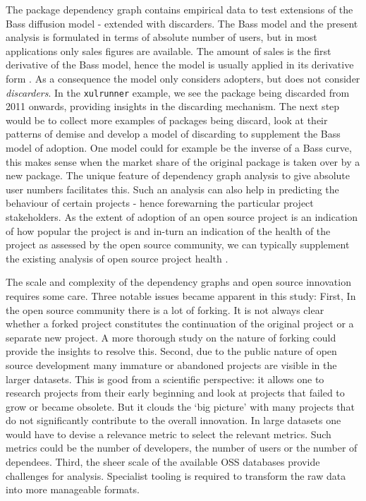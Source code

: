 \documentclass[smallextended,final]{svjour3}
\begin{document}
The package dependency graph contains empirical data to test extensions of the Bass diffusion model - extended with discarders. The Bass model and the present analysis is formulated in terms of absolute number of users, but in most applications only sales figures are available. The amount of sales is the first derivative of the Bass model, hence the model is usually applied in its derivative form \citep{mahajan95}. As a consequence the model only considers adopters, but does not consider \emph{discarders}. In the \verb|xulrunner| example, we see the package being discarded from 2011 onwards, providing insights in the discarding mechanism. The next step would be to collect more examples of packages being discard, look at their patterns of demise and develop a model of discarding to supplement the Bass model of adoption. One model could for example be the inverse of a Bass curve, this makes sense when the market share of the original package is taken over by a new package. The unique feature of dependency graph analysis to give absolute user numbers facilitates this. Such an analysis can also help in predicting the behaviour of certain projects - hence forewarning the particular project stakeholders. As the extent of adoption of an open source project is an indication of how popular the project is and in-turn an indication of the health of the project as assessed by the open source community, we can typically supplement the existing analysis of open source project health \citep{daniel13,amrit10a,piggot13}.

The scale and complexity of the dependency graphs and open source innovation requires some care. Three notable issues became apparent in this study: First, In the open source community there is a lot of forking. It is not always clear whether a forked project constitutes the continuation of the original project or a separate new project. A more thorough study on the nature of forking could provide the insights to resolve this. Second, due to the public nature of open source development many immature or abandoned projects are visible in the larger datasets. This is good from a scientific perspective: it allows one to research projects from their early beginning and look at projects that failed to grow or became obsolete. But it clouds the `big picture' with many projects that do not significantly contribute to the overall innovation. In large datasets one would have to devise a relevance metric to select the relevant metrics. Such metrics could be the number of developers, the number of users or the number of dependees. Third, the sheer scale of the available OSS databases provide challenges for analysis. Specialist tooling is required to transform the raw data into more manageable formats.
\end{document}
